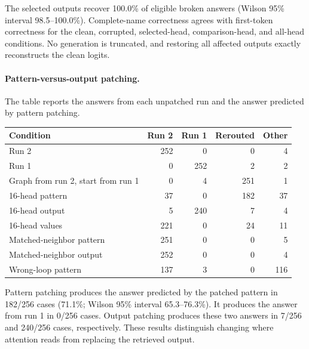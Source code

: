 \documentclass{article}
\begin{document}
The selected outputs recover 100.0\% of eligible broken answers (Wilson 95\% interval 98.5--100.0\%). Complete-name correctness agrees with first-token correctness for the clean, corrupted, selected-head, comparison-head, and all-head conditions. No generation is truncated, and restoring all affected outputs exactly reconstructs the clean logits.

\paragraph{Pattern-versus-output patching.}
The table reports the answers from each unpatched run and the answer predicted by pattern patching.
\begin{center}\begin{minipage}{\linewidth}\centering\centering
\captionsetup{hypcap=false}
\begin{tabular}{@{}lrrrr@{}}\toprule
Condition & Run 2 & Run 1 & Rerouted & Other\\\midrule
Run 2 & 252 & 0 & 0 & 4 \\
Run 1 & 0 & 252 & 2 & 2 \\
Graph from run 2, start from run 1 & 0 & 4 & 251 & 1 \\
16-head pattern & 37 & 0 & 182 & 37 \\
16-head output & 5 & 240 & 7 & 4 \\
16-head values & 221 & 0 & 24 & 11 \\
Matched-neighbor pattern & 251 & 0 & 0 & 5 \\
Matched-neighbor output & 252 & 0 & 0 & 4 \\
Wrong-loop pattern & 137 & 3 & 0 & 116 \\
\bottomrule\end{tabular}\end{minipage}\end{center}

Pattern patching produces the answer predicted by the patched pattern in 182/256 cases (71.1\%; Wilson 95\% interval 65.3--76.3\%). It produces the answer from run 1 in 0/256 cases. Output patching produces these two answers in 7/256 and 240/256 cases, respectively. These results distinguish changing where attention reads from replacing the retrieved output.
\end{document}

